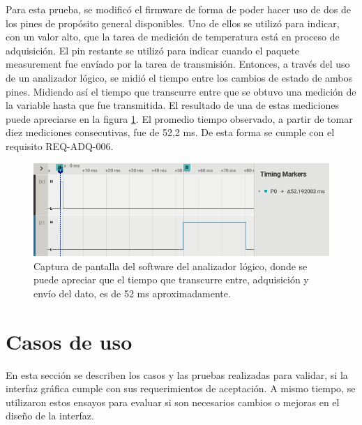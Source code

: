 Para esta prueba, se modificó el firmware de forma de poder hacer uso de dos de los pines de propósito general disponibles. Uno de ellos se utilizó para indicar, con un valor alto, que la tarea de medición de temperatura está en proceso de adquisición. El pin restante se utilizó para indicar cuando el paquete measurement fue envíado por la tarea de transmisión. Entonces, a través del uso de un analizador lógico, se midió el tiempo entre los cambios de estado de ambos pines. Midiendo así el tiempo que transcurre entre que se obtuvo una medición de la variable hasta que fue transmitida. El resultado de una de estas mediciones puede apreciarse en la figura \ref{fig:tiempo-envio}. El promedio tiempo observado, a partir de tomar diez mediciones consecutivas, fue de 52,2 ms. De esta forma se cumple con el requisito REQ-ADQ-006.

\begin{figure}[htpb]
\centering
\includegraphics[width=\textwidth]{./Figures/tiempo-envio.png}
\caption{Captura de pantalla del software del analizador lógico, donde se puede apreciar que el tiempo que transcurre entre, adquisición y envío del dato, es de 52 ms aproximadamente.}
\label{fig:tiempo-envio}
\end{figure}

\break

\section{Casos de uso}

En esta sección se describen los casos y las pruebas realizadas para validar, si la interfaz gráfica cumple con sus requerimientos de aceptación. A mismo tiempo, se utilizaron estos ensayos para evaluar si son necesarios cambios o mejoras en el diseño de la interfaz.

